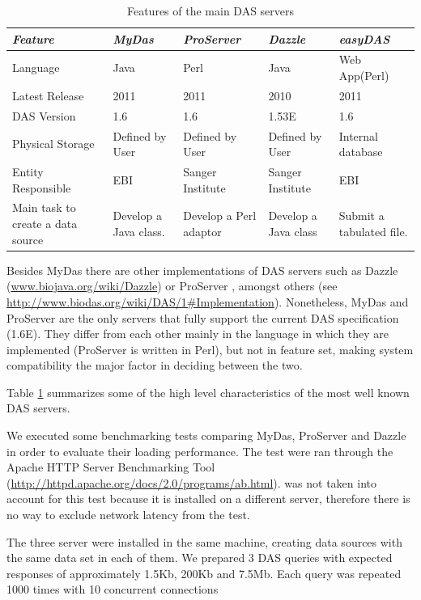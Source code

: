 \begin{table}[t]
	\begin{tabular}{|p{3cm}|p{2.7cm}|p{2.7cm}|p{2.7cm}|p{2.7cm}|}
\hline 
\emph{Feature} & \emph{MyDas} & \emph{ProServer} & \emph{Dazzle} & \emph{easyDAS}\\
\hline 
Language & Java & Perl & Java & Web App(Perl)\\
\hline 
Latest Release & 2011 & 2011 & 2010 & 2011\\
\hline 
DAS Version & 1.6 & 1.6 & 1.53E\footnotemark  & 1.6\\
\hline 
Physical Storage & Defined by User & Defined by User & Defined by User & Internal database\\
\hline 
Entity Responsible & EBI & Sanger Institute & Sanger Institute & EBI\\
\hline 
Main task to create a data source & Develop a Java class. & Develop a Perl adaptor & Develop a Java class & Submit a tabulated file.\\
\hline 
	\end{tabular}
	\caption{Features of the main DAS servers}
	\label{tab:table1}
\end{table}

Besides MyDas there are other implementations of DAS servers such as Dazzle (\url{www.biojava.org/wiki/Dazzle}) or ProServer \cite{FIN2007},  amongst others (see \url{http://www.biodas.org/wiki/DAS/1#Implementation}). Nonetheless, MyDas and ProServer are the only servers that fully support the current DAS specification (1.6E). They differ from each other mainly in the language in which they are implemented (ProServer is written in Perl), but not in feature set, making system compatibility the major factor in deciding between the two.

Table \ref{tab:table1} summarizes some of the high level characteristics of the most well known DAS servers. 

We executed some benchmarking tests comparing MyDas, ProServer and Dazzle  in order to evaluate their loading performance. The test were ran through the Apache HTTP Server Benchmarking Tool (\url{http://httpd.apache.org/docs/2.0/programs/ab.html}).  was not taken into account for this test because it is installed on a different server, therefore there is no way to exclude network latency from the test.

The three server were installed in the same machine, creating data sources with the same data set in each of them. We prepared 3 DAS queries with expected responses of approximately 1.5Kb, 200Kb and 7.5Mb. Each query was repeated 1000 times with 10 concurrent connections

